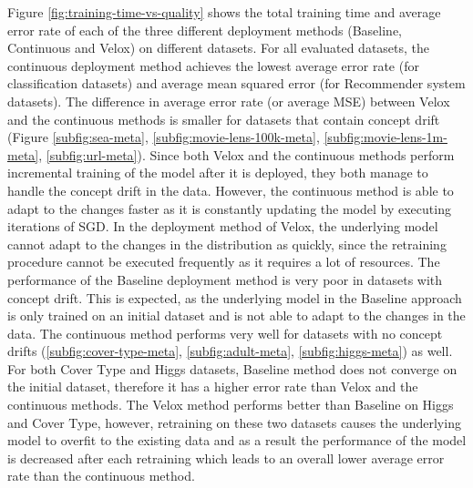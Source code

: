 \documentclass{vldb}
\begin{document}
Figure \ref{fig:training-time-vs-quality} shows the total training time and average error rate of each of the three different deployment methods (Baseline, Continuous and Velox) on different datasets.
For all evaluated datasets, the continuous deployment method achieves the lowest average error rate (for classification datasets) and average mean squared error (for Recommender system datasets).
The difference in average error rate (or average MSE) between Velox and the continuous methods is smaller for datasets that contain concept drift (Figure \ref{subfig:sea-meta}, \ref{subfig:movie-lens-100k-meta}, \ref{subfig:movie-lens-1m-meta}, \ref{subfig:url-meta}).
Since both Velox and the continuous methods perform incremental training of the model after it is deployed, they both manage to handle the concept drift in the data.
However, the continuous method is able to adapt to the changes faster as it is constantly updating the model by executing iterations of SGD.
In the deployment method of Velox, the underlying model cannot adapt to the changes in the distribution as quickly, since the retraining procedure cannot be executed frequently as it requires a lot of resources.
The performance of the Baseline deployment method is very poor in datasets with concept drift.
This is expected, as the underlying model in the Baseline approach is only trained on an initial dataset and is not able to adapt to the changes in the data.
The continuous method performs very well for datasets with no concept drifts (\ref{subfig:cover-type-meta},  \ref{subfig:adult-meta}, \ref{subfig:higgs-meta}) as well.
For both Cover Type and Higgs datasets, Baseline method does not converge on the initial dataset, therefore it has a higher error rate than Velox and the continuous methods.
The Velox method performs better than Baseline on Higgs and Cover Type, however, retraining on these two datasets causes the underlying model to overfit to the existing data and as a result the performance of the model is decreased after each retraining which leads to an overall lower average error rate than the continuous method.
\end{document}
